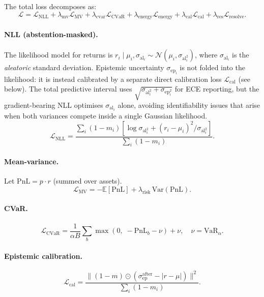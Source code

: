 \documentclass[11pt,a4paper]{article}
\newcommand{\sep}{\sigma_{\mathrm{ep}}}
\newcommand{\sal}{\sigma_{\mathrm{al}}}
\newcommand{\sepa}{\sigma_{\mathrm{ep}}^{\mathrm{after}}}
\newcommand{\Lres}{\mathcal{L}_{\mathrm{resolve}}}
\begin{document}
The total loss decomposes as:
\begin{equation}
  \mathcal{L} =
    \mathcal{L}_{\mathrm{NLL}}
    + \lambda_{\mathrm{mv}} \mathcal{L}_{\mathrm{MV}}
    + \lambda_{\mathrm{cvar}} \mathcal{L}_{\mathrm{CVaR}}
    + \lambda_{\mathrm{energy}} \mathcal{L}_{\mathrm{energy}}
    + \lambda_{\mathrm{cal}} \mathcal{L}_{\mathrm{cal}}
    + \lambda_{\mathrm{res}} \Lres.
\end{equation}

\paragraph{NLL (abstention-masked).}
The likelihood model for returns is $r_i \mid \mu_i, \sal_i \sim \mathcal{N}(\mu_i, \sal_i^2)$,
where $\sal_i$ is the \emph{aleatoric} standard deviation.  Epistemic uncertainty
$\sep_i$ is not folded into the likelihood: it is instead calibrated by a
separate direct calibration loss $\mathcal{L}_{\mathrm{cal}}$ (see below).
The total predictive interval uses $\sqrt{\sal_i^2 + \sep_i^2}$ for ECE
reporting, but the gradient-bearing NLL optimises $\sal_i$ alone, avoiding
identifiability issues that arise when both variances compete inside a single
Gaussian likelihood.
\begin{equation}
  \mathcal{L}_{\mathrm{NLL}} =
    \frac{\sum_{i} (1-m_i)\!\left[\log \sal_i^2 + (r_i - \mu_i)^2 / \sal_i^2\right]}
         {\sum_i (1 - m_i)}.
\end{equation}

\paragraph{Mean-variance.}
Let $\mathrm{PnL} = p \cdot r$ (summed over assets).
\begin{equation}
  \mathcal{L}_{\mathrm{MV}} = -\mathbb{E}[\mathrm{PnL}] + \lambda_{\mathrm{risk}}\,\mathrm{Var}(\mathrm{PnL}).
\end{equation}

\paragraph{CVaR.}
\begin{equation}
  \mathcal{L}_{\mathrm{CVaR}} = \frac{1}{\alpha B}\sum_b \max(0,\; -\mathrm{PnL}_b - \nu)
    + \nu, \quad \nu = \mathrm{VaR}_\alpha.
\end{equation}

\paragraph{Epistemic calibration.}
\begin{equation}
  \mathcal{L}_{\mathrm{cal}} =
    \frac{\|(1-m)\odot(\sepa - |r - \mu|)\|^2}{\sum_i (1-m_i)}.
\end{equation}
\end{document}
